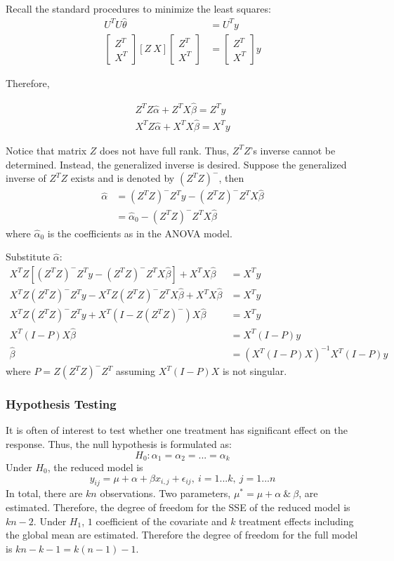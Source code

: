 \documentclass[9pt]{article}
\begin{document}
Recall the standard procedures to minimize the least squares:
\begin{align*}
    U^TU\hat \theta &= U^Ty\\
    \begin{bmatrix}Z^T\\ X^T \end{bmatrix}[Z\ X]\begin{bmatrix}Z^T\\X^T\end{bmatrix} &= \begin{bmatrix}Z^T\\ X^T \end{bmatrix}y
\end{align*}

Therefore, 

\begin{align*}
Z^TZ\hat \alpha + Z^TX\hat \beta = Z^Ty \\
X^TZ\hat \alpha + X^TX\hat \beta = X^Ty    
\end{align*}

Notice that matrix $Z$ does not have full rank. Thus, $Z^TZ$'s inverse cannot be determined. Instead, the generalized inverse is desired. Suppose the generalized inverse of $Z^TZ$ exists and is denoted by $(Z^TZ)^-$, then
\begin{align*}
    \hat \alpha &= (Z^TZ)^-Z^Ty - (Z^TZ)^-Z^TX\hat \beta\\
    &= \hat \alpha_0 - (Z^TZ)^-Z^TX\hat \beta
\end{align*}
where $\hat \alpha_0$ is the coefficients as in the ANOVA model. \newline

Substitute $\hat \alpha$:
\begin{align*}
    X^TZ[(Z^TZ)^-Z^Ty-(Z^TZ)^-Z^TX\hat\beta] + X^TX\hat\beta &= X^Ty\\
    X^TZ(Z^TZ)^-Z^Ty-X^TZ(Z^TZ)^-Z^TX\hat\beta+X^TX\hat\beta &= X^Ty\\
    X^TZ(Z^TZ)^-Z^Ty+X^T(I-Z(Z^TZ)^-)X\hat\beta &= X^Ty\\
    X^T(I-P)X\hat\beta &= X^T(I-P)y\\
    \hat\beta &= (X^T(I-P)X)^{-1}X^T(I-P)y
\end{align*}
where $P=Z(Z^TZ)^-Z^T$ assuming $X^T(I-P)X$ is not singular.

\subsubsection{Hypothesis Testing}
It is often of interest to test whether one treatment has significant effect on the response. Thus, the null hypothesis is formulated as:
$$
    H_0:\alpha_1 = \alpha_2 = ... = \alpha_k
$$
Under $H_0$, the reduced model is 
$$
    y_{ij} = \mu + \alpha + \beta x_{i,j} + \epsilon_{ij},\ i=1...k,\ j=1...n
$$
In total, there are $kn$ observations. Two parameters, $\mu^*=\mu+\alpha\ \&\ \beta$, are estimated. Therefore, the degree of freedom for the SSE of the reduced model is $kn-2$.  Under $H_1$, $1$ coefficient of the covariate and $k$ treatment effects including the global mean are estimated. Therefore the degree of freedom for the full model is $kn-k-1 = k(n-1)-1$. 
\end{document}
